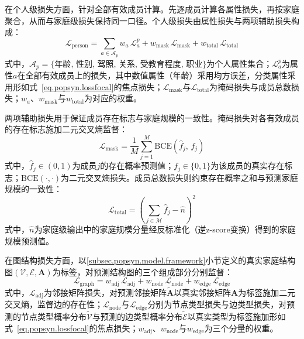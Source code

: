 在个人级损失方面，针对全部有效成员计算。先逐成员计算各属性损失，再按家庭聚合，从而与家庭级损失保持同一口径。个人级损失由属性损失与两项辅助损失构成：
\begin{equation}
  \mathcal{L}_{\mathrm{person}} = \sum_{a \in \mathcal{A}_p} w_{a}\, \mathcal{L}_{a}^{p} + w_{\mathrm{mask}}\, \mathcal{L}_{\mathrm{mask}} + w_{\mathrm{total}}\, \mathcal{L}_{\mathrm{total}}
  \label{eq.popsyn.lossper}
\end{equation}
式中，$\mathcal{A}_p = \{\text{年龄},\, \text{性别},\, \text{驾照},\, \text{关系},\, \text{受教育程度},\, \text{职业}\}$为个人属性集合；$\mathcal{L}_{a}^{p}$为属性$a$在全部有效成员上的损失，其中数值属性（年龄）采用均方误差，分类属性采用形如式~\eqref{eq.popsyn.lossfocal}的焦点损失；$\mathcal{L}_{\mathrm{mask}}$与$\mathcal{L}_{\mathrm{total}}$为掩码损失与成员总数损失；$w_a$、$w_{\mathrm{mask}}$与$w_{\mathrm{total}}$为对应的权重。
 
两项辅助损失用于保证成员存在标志与家庭规模的一致性。掩码损失对各有效成员的存在标志施加二元交叉熵监督：
\begin{equation}
  \mathcal{L}_{\mathrm{mask}} = \frac{1}{M} \sum_{j=1}^{M} \mathrm{BCE}\left(\hat{f}_j,\, f_j\right)
  \label{eq.popsyn.lossmask}
\end{equation}
式中，$\hat{f}_j \in (0, 1)$为成员$j$的存在概率预测值；$f_j \in \{0, 1\}$为该成员的真实存在标志；$\mathrm{BCE}(\cdot, \cdot)$为二元交叉熵损失。成员总数损失则约束存在概率之和与预测家庭规模的一致性：
\begin{equation}
  \mathcal{L}_{\mathrm{total}} = \left( \sum_{j \in \mathcal{M}} \hat{f}_j - \hat{n} \right)^{2}
  \label{eq.popsyn.losstot}
\end{equation}
式中，$\hat{n}$为家庭级输出中的家庭规模分量经反标准化（逆z-score变换）得到的家庭规模预测值。
 
在图结构损失方面，以\ref{subsec.popsyn.model.framework}小节定义的真实家庭结构图$(\mathcal{V}, \mathcal{E}, \mathbf{A})$为标签，对预测结构图的三个组成部分分别监督：
\begin{equation}
  \mathcal{L}_{\mathrm{graph}} = w_{\mathrm{adj}}\, \mathcal{L}_{\mathrm{adj}} + w_{\mathrm{node}}\, \mathcal{L}_{\mathrm{node}} + w_{\mathrm{edge}}\, \mathcal{L}_{\mathrm{edge}}
  \label{eq.popsyn.lossgraph}
\end{equation}
式中，$\mathcal{L}_{\mathrm{adj}}$为邻接矩阵损失，对预测邻接矩阵$\tilde{\mathbf{A}}$以真实邻接矩阵$\mathbf{A}$为标签施加二元交叉熵，监督边的存在性；$\mathcal{L}_{\mathrm{node}}$与$\mathcal{L}_{\mathrm{edge}}$分别为节点类型损失与边类型损失，对预测的节点类型概率分布$\tilde{\mathcal{V}}$与预测的边类型概率分布$\tilde{\mathcal{E}}$以真实类型为标签施加形如式~\eqref{eq.popsyn.lossfocal}的焦点损失；$w_{\mathrm{adj}}$、$w_{\mathrm{node}}$与$w_{\mathrm{edge}}$为三个分量的权重。
 
